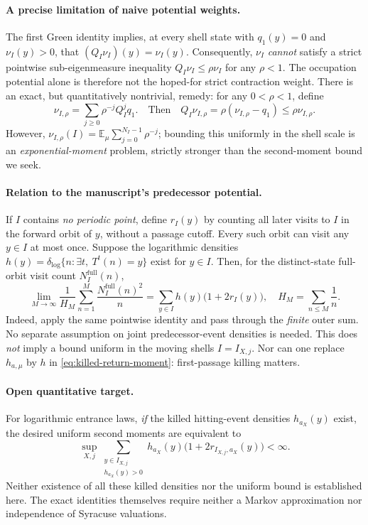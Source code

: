 \paragraph{A precise limitation of naive potential weights.}
The first Green identity implies, at every shell state with
$q_1(y)=0$ and $\nu_I(y)>0$, that $(Q_I\nu_I)(y)=\nu_I(y)$.
Consequently, $\nu_I$ \emph{cannot} satisfy a strict pointwise
sub-eigenmeasure inequality $Q_I\nu_I\le\rho\nu_I$ for any $\rho<1$.
The occupation potential alone is therefore not the hoped-for strict
contraction weight. There is an exact, but quantitatively nontrivial,
remedy: for any $0<\rho<1$, define
\[
 \nu_{I,\rho}=\sum_{j\ge0}\rho^{-j}Q_I^j q_1.
 \quad\text{Then}\quad
 Q_I\nu_{I,\rho}=\rho(\nu_{I,\rho}-q_1)\le\rho\nu_{I,\rho}.
\]
However, $\nu_{I,\rho}(I)=\mathbb E_\mu\sum_{j=0}^{N_I-1}\rho^{-j}$;
bounding this uniformly in the shell scale is an \emph{exponential-moment}
problem, strictly stronger than the second-moment bound we seek.

\paragraph{Relation to the manuscript's predecessor potential.}
If $I$ contains \emph{no periodic point}, define $r_I(y)$ by counting
all later visits to $I$ in the forward orbit of $y$, without a passage
cutoff. Every such orbit can visit any $y\in I$ at most once. Suppose the
logarithmic densities $h(y)=\delta_{\log}\{n:\exists t,\ T^t(n)=y\}$
exist for $y\in I$. Then, for the distinct-state full-orbit visit count
$N_I^{\mathrm{full}}(n)$,
\begin{equation}\label{eq:full-log-second-moment}
 \boxed{\displaystyle
 \lim_{M\to\infty}\frac1{H_M}
   \sum_{n=1}^{M}\frac{N_I^{\mathrm{full}}(n)^2}{n}
 =\sum_{y\in I}h(y)\bigl(1+2r_I(y)\bigr),\quad
 H_M=\sum_{n\le M}\frac1n.}
\end{equation}
Indeed, apply the same pointwise identity and pass through the \emph{finite}
outer sum. No separate assumption on joint predecessor-event densities
is needed. This does \emph{not} imply a bound uniform in the moving
shells $I=I_{X,j}$. Nor can one replace $h_{a,\mu}$ by $h$ in
\eqref{eq:killed-return-moment}: first-passage killing matters.

\paragraph{Open quantitative target.}
For logarithmic entrance laws, \emph{if} the killed hitting-event densities
$h_{a_X}(y)$ exist, the desired uniform second moments are equivalent to
\[
 \sup_{X,j}\sum_{\substack{y\in I_{X,j}\\h_{a_X}(y)>0}}
 h_{a_X}(y)\bigl(1+2r_{I_{X,j},a_X}(y)\bigr)<\infty.
\]
Neither existence of all these killed densities nor the uniform bound
is established here. The exact identities themselves require neither a
Markov approximation nor independence of Syracuse valuations.
